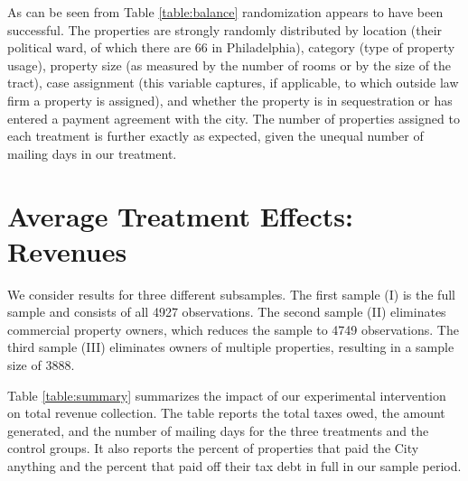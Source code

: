 \documentclass[12pt,titlepage]{article}
\begin{document}
As can be seen from Table \ref{table:balance} randomization appears to
have been successful.  The properties are strongly randomly
distributed by location (their political ward, of which there are 66
in Philadelphia), category (type of property usage), property size (as
measured by the number of rooms or by the size of the tract), case
assignment (this variable captures, if applicable, to which outside
law firm a property is assigned), and whether the property is in
sequestration or has entered a payment agreement with the city. The
number of properties assigned to each treatment is further exactly as
expected, given the unequal number of mailing days in our treatment.


\section{Average Treatment Effects: Revenues}


We consider results for three different subsamples.  The first sample
(I) is the full sample and consists of all 4927 observations. The
second sample (II) eliminates commercial property owners, which
reduces the sample to 4749 observations. The third sample (III)
eliminates owners of multiple properties, resulting in a sample size
of 3888.

Table \ref{table:summary} summarizes the impact of our experimental
intervention on total revenue collection.  The table reports the total
taxes owed, the amount generated, and the number of mailing days for
the three treatments and the control groups. It also reports the
percent of properties that paid the City anything and the percent that
paid off their tax debt in full in our sample period.
\end{document}
